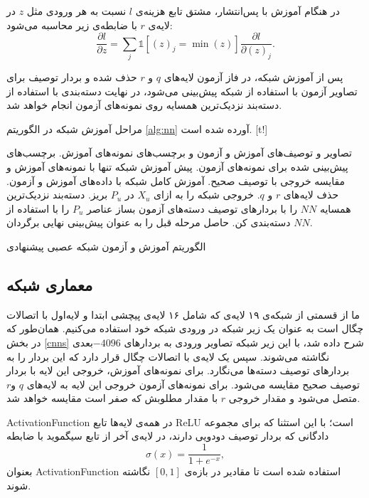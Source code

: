 در هنگام آموزش با پس‌انتشار، مشتق تابع هزینه‌ی $l$ نسبت به هر ورودی مثل $z$ در لایه‌ی $r$ با ضابطه‌ی زیر محاسبه می‌شود:
\begin{equation}
\label{eq:grad_min}
\frac{\partial l}{\partial z} = \sum_j \mathds{1}[(z)_j=\min(z)]  \frac{\partial l}{\partial (z)_j}.
\end{equation}

پس از آموزش شبکه، در فاز آزمون لایه‌های $q$ و $r$ حذف شده و بردار توصیف برای تصاویر آزمون با استفاده از شبکه پیش‌بینی می‌شود، در نهایت دسته‌بندی با استفاده از دسته‌بند نزدیک‌ترین همسایه روی نمونه‌های آزمون انجام خواهد شد.

مراحل آموزش شبکه در الگوریتم \ref{alg:nn} آورده شده است.
[t!]
\begin{enumerate}[label={\arabic*},itemsep=.1em, parsep=.1em]
 تصاویر و توصیف‌های آموزش و آزمون و برچسب‌های نمونه‌های آموزش.
 برچسب‌های پیش‌بینی شده برای نمونه‌های آزمون.
 پیش آموزش شبکه تنها با نمونه‌های آموزش و مقایسه خروجی با توصیف صحیح.
 آموزش کامل شبکه با داده‌های آموزش و آزمون.
 حذف لایه‌های $r$ و $q$.
 خروجی شبکه را به ازای $X_u$ در $P_u$ بریز.
 دسته‌بند نزدیک‌ترین همسایه $NN$ را با بردارهای توصیف دسته‌های آزمون بساز
 عناصر $P_u$ را با استفاده از $NN$ دسته‌بندی کن.
 حاصل مرحله قبل را به عنوان پیش‌بینی نهایی برگردان.
\end{enumerate}
\caption{الگوریتم آموزش و آزمون شبکه عصبی پیشنهادی}
\label{alg:nn}
\subsection{معماری شبکه}\label{net_architechture}
ما از قسمتی از شبکه‌ی ۱۹ لایه‌ی  \cite{vgg} که شامل ۱۶ لایه‌ی پیچشی ابتدا و لایه‌‌‌اول با اتصالات چگال است به عنوان یک زیر شبکه در ورودی شبکه خود استفاده می‌کنیم. همان‌طور که در بخش
\ref{cnns}
شرح داده شد،
 با این زیر شبکه تصاویر ورودی به بردارهای $-4096$بعدی نگاشته می‌شوند.
  سپس یک لایه‌ی با اتصالات چگال قرار دارد که این بردار را به بردارهای توصیف دسته‌ها می‌نگارد. برای نمونه‌های آموزش، خروجی این لایه با بردار توصیف صحیح مقایسه می‌شود. برای نمونه‌های آزمون خروجی این لایه به  لایه‌های  $q$ و$r$ متصل می‌شود و مقدار خروجی $r$ با مقدار مطلوبش که صفر است مقایسه خواهد شد.

\gls{ActivationFunction} در همه‌ی لایه‌ها تابع \gls{ReLU} است؛ با این استثنا که برای مجموعه‌ دادگانی که بردار توصیف دودویی دارند، در لایه‌ی آخر از تابع سیگموید با ضابطه
\begin{equation}
\sigma(x) = \frac{1}{1 + e^{-x}},
\end{equation}
بعنوان \gls{ActivationFunction} استفاده شده است تا مقادیر در بازه‌ی $[0,1]$ نگاشته شوند.

